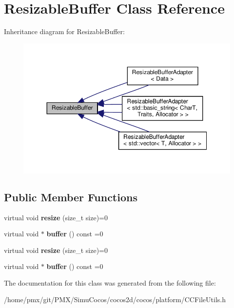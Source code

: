\hypertarget{classResizableBuffer}{}\section{Resizable\+Buffer Class Reference}
\label{classResizableBuffer}


Inheritance diagram for Resizable\+Buffer\+:
\nopagebreak
\begin{figure}[H]
\begin{center}
\leavevmode
\includegraphics[width=350pt]{classResizableBuffer__inherit__graph}
\end{center}
\end{figure}
\subsection*{Public Member Functions}
\begin{DoxyCompactItemize}
\item 
\mbox{\label{classResizableBuffer_a57fedf53c4b6237e9447a857122eadb0}} 
virtual void {\bfseries resize} (size\+\_\+t size)=0
\item 
\mbox{\label{classResizableBuffer_a050c456cda9486653d1f8fc5c96ae88d}} 
virtual void $\ast$ {\bfseries buffer} () const =0
\item 
\mbox{\label{classResizableBuffer_a57fedf53c4b6237e9447a857122eadb0}} 
virtual void {\bfseries resize} (size\+\_\+t size)=0
\item 
\mbox{\label{classResizableBuffer_a050c456cda9486653d1f8fc5c96ae88d}} 
virtual void $\ast$ {\bfseries buffer} () const =0
\end{DoxyCompactItemize}


The documentation for this class was generated from the following file\+:\begin{DoxyCompactItemize}
\item 
/home/pmx/git/\+P\+M\+X/\+Simu\+Cocos/cocos2d/cocos/platform/C\+C\+File\+Utils.\+h\end{DoxyCompactItemize}

